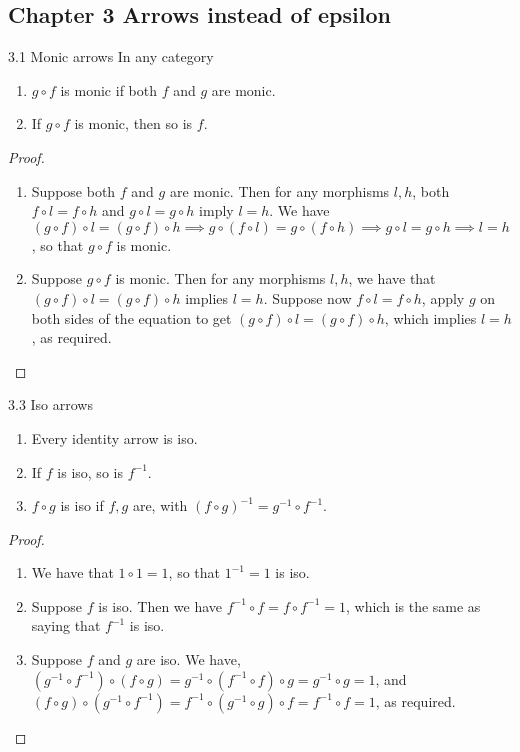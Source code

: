 \subsection*{Chapter 3 Arrows instead of epsilon}

\begin{exercise}{3.1 Monic arrows}
In any category 
\begin{enumerate}
    \item $g\circ f$ is monic if both $f$ and $g$ are monic.
    \item If $g\circ f$ is monic, then so is $f$.
\end{enumerate}
\end{exercise}
\begin{proof}
 \begin{enumerate}
     \item Suppose both $f$ and $g$ are monic. Then for any morphisms $l, h$, both $f\circ l = f\circ h$ and $g\circ l= g\circ h$ imply $l=h$. We have $(g\circ f) \circ l = (g\circ f) \circ h\implies g\circ (f\circ l) = g\circ(f \circ h) \implies g \circ l = g\circ h\implies l=h$, so that $g\circ f$ is monic.
     \item Suppose $g\circ f$ is monic. Then for any morphisms $l, h$, we have that $(g\circ f)\circ l=(g\circ f)\circ h$ implies $l=h$. Suppose now $f\circ l=f\circ h$, apply $g$ on both sides of the equation to get $(g\circ f)\circ l=(g\circ f)\circ h$, which implies $l=h$, as required.
 \end{enumerate}
\end{proof}

\begin{exercise}{3.3 Iso arrows}
\begin{enumerate}
    \item Every identity arrow is iso.
    \item If $f$ is iso, so is $f^{-1}$.
    \item $f\circ g$ is iso if $f, g$ are, with $(f\circ g)^{-1}=g^{-1}\circ f^{-1}$. 
\end{enumerate}
\end{exercise}
\begin{proof}
 \begin{enumerate}
     \item We have that $1\circ 1=1$, so that $1^{-1}=1$ is iso.
     \item Suppose $f$ is iso. Then we have $f^{-1}\circ f= f\circ f^{-1}=1$, which is the same as saying that $f^{-1}$ is iso.
     \item Suppose $f$ and $g$ are iso. We have, $(g^{-1}\circ f^{-1})\circ(f\circ g)= g^{-1}\circ (f^{-1}\circ f)\circ g= g^{-1}\circ g= 1$, and $(f\circ g)\circ(g^{-1}\circ f^{-1})= f^{-1}\circ (g^{-1}\circ g)\circ f= f^{-1}\circ f= 1$, as required.
 \end{enumerate}
\end{proof}

